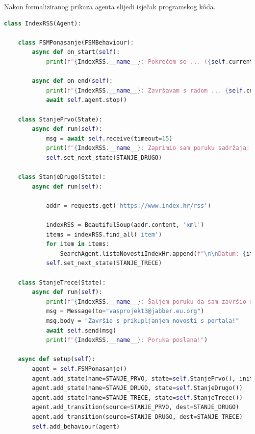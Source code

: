 \documentclass[]{foi} %
\begin{document}
Nakon formaliziranog prikaza agenta slijedi isječak programskog kôda.
\begin{lstlisting}[language=Python]
class IndexRSS(Agent):

    class FSMPonasanje(FSMBehaviour):
        async def on_start(self):
            print(f"{IndexRSS.__name__}: Pokrećem se ... ({self.current_state})")

        async def on_end(self):
            print(f"{IndexRSS.__name__}: Završavam s radom ... {self.current_state}")
            await self.agent.stop()

    class StanjePrvo(State):
        async def run(self):
            msg = await self.receive(timeout=15)
            print(f"{IndexRSS.__name__}: Zaprimio sam poruku sadržaja: \"{msg.body}\"")
            self.set_next_state(STANJE_DRUGO)

    class StanjeDrugo(State):
        async def run(self):
            
            addr = requests.get('https://www.index.hr/rss')

            indexRSS = BeautifulSoup(addr.content, 'xml')
            items = indexRSS.find_all('item')
            for item in items:
                SearchAgent.listaNovostiIndexHr.append(f"\n\nDatum: {item.pubDate.text}.\n\nNaslov: {item.title.text}\n\nSažetak: {item.description.text}\n\nPoveznica: {item.link.text}\n\n-----------------------------------------")
            self.set_next_state(STANJE_TRECE)

    class StanjeTrece(State):
        async def run(self):
            print(f"{IndexRSS.__name__}: Šaljem poruku da sam završio s prikupljanjem novosti ...")
            msg = Message(to="vasprojekt3@jabber.eu.org")
            msg.body = "Završio s prikupljanjem novosti s portala!"
            await self.send(msg)
            print(f"{IndexRSS.__name__}: Poruka poslana!")

    async def setup(self):
        agent = self.FSMPonasanje()
        agent.add_state(name=STANJE_PRVO, state=self.StanjePrvo(), initial=True)
        agent.add_state(name=STANJE_DRUGO, state=self.StanjeDrugo())
        agent.add_state(name=STANJE_TRECE, state=self.StanjeTrece())
        agent.add_transition(source=STANJE_PRVO, dest=STANJE_DRUGO)
        agent.add_transition(source=STANJE_DRUGO, dest=STANJE_TRECE)
        self.add_behaviour(agent)
\end{lstlisting}
\end{document}
